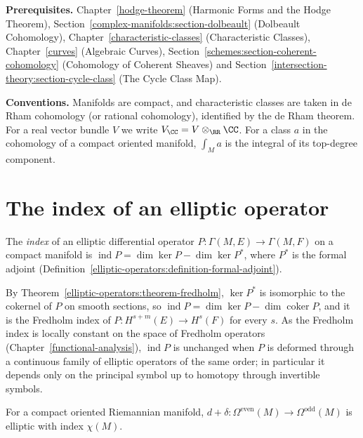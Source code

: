\noindent\textbf{Prerequisites.} Chapter~\ref{hodge-theorem} (Harmonic Forms and the Hodge Theorem), Section~\ref{complex-manifolds:section-dolbeault} (Dolbeault Cohomology), Chapter~\ref{characteristic-classes} (Characteristic Classes),
Chapter~\ref{curves} (Algebraic Curves), Section~\ref{schemes:section-coherent-cohomology} (Cohomology of Coherent Sheaves) and Section~\ref{intersection-theory:section-cycle-class} (The Cycle Class Map).

\noindent\textbf{Conventions.} Manifolds are compact, and characteristic classes are taken in de Rham cohomology (or rational cohomology), identified by the de Rham theorem. For a real vector bundle $V$ we write
$V_\CC = V \otimes_\RR \CC$. For a class $a$ in the cohomology of a compact oriented manifold, $\int_Ma$ is the integral of its top-degree component.

\section{The index of an elliptic operator}\label{intersection-theory:section-index}

\begin{definition}\label{intersection-theory:definition-index}
The \emph{index} of an elliptic differential operator $P \colon \Gamma(M, E) \to \Gamma(M, F)$ on a compact manifold is $\operatorname{ind}P = \dim\ker P - \dim\ker P^*$, where $P^*$ is the formal adjoint
(Definition~\ref{elliptic-operators:definition-formal-adjoint}).
\end{definition}

By Theorem~\ref{elliptic-operators:theorem-fredholm}, $\ker P^*$ is isomorphic to the cokernel of $P$ on smooth sections, so $\operatorname{ind}P = \dim\ker P - \dim\operatorname{coker}P$, and it is the Fredholm index of
$P \colon H^{s+m}(E) \to H^s(F)$ for every $s$. As the Fredholm index is locally constant on the space of Fredholm operators (Chapter~\ref{functional-analysis}), $\operatorname{ind}P$ is unchanged when $P$ is deformed through a
continuous family of elliptic operators of the same order; in particular it depends only on the principal symbol up to homotopy through invertible symbols.

\begin{proposition}\label{intersection-theory:proposition-euler-operator}
For a compact oriented Riemannian manifold, $d + \delta \colon \Omega^{\mathrm{even}}(M) \to \Omega^{\mathrm{odd}}(M)$ is elliptic with index $\chi(M)$.
\end{proposition}

